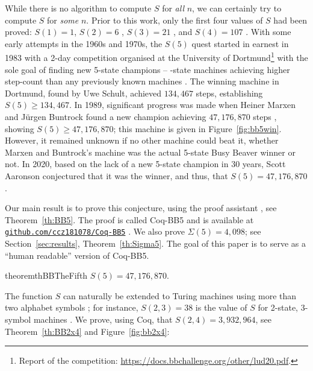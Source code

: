 \documentclass[a4paper,british]{article}
\theoremstyle{definition} %
\numberwithin{equation}{section}
\theoremstyle{definition} %
\newcommand{\BBtheFifth}{47{,}176{,}870}
\newcommand{\SigmaTheFifth}{4{,}098}
\newcommand{\BBTxF}{3{,}932{,}964}
\newcommand{\CoqBB}{Coq-BB5\xspace}
\begin{document}
While there is no algorithm to compute $S$ for \textit{all} $n$, we can certainly try to compute $S$ for \textit{some} $n$. Prior to this work, only the first four values of $S$ had been proved: $S(1)=1$, $S(2)=6$ \cite{Rado_1962}, $S(3) = 21$ \cite{Lin1963}, and $S(4) = 107$ \cite{Brady83}. With some early attempts in the 1960s and 1970s, the $S(5)$ quest started in earnest in 1983 with a 2-day competition organised at the University of Dortmund\footnote{Report of the competition: \url{https://docs.bbchallenge.org/other/lud20.pdf}.} with the sole goal of finding new 5-state champions -- -state machines achieving higher step-count than any previously known machines \cite{PMichel_website,michel2019busy}. The winning machine in Dortmund, found by Uwe Schult, achieved $134{,}467$ steps, establishing $S(5) \geq 134{,}467$. In 1989, significant progress was made when Heiner Marxen and J\"urgen Buntrock found a new champion achieving $\BBtheFifth$ steps \cite{Marxen_1990}, showing $S(5) \geq \BBtheFifth$; this machine is given in Figure~\ref{fig:bb5win}. However, it remained unknown if no other machine could beat it, \ie whether Marxen and Buntrock's machine was the actual 5-state Busy Beaver winner or not. In 2020, based on the lack of a new 5-state champion in 30 years, Scott Aaronson conjectured that it was the winner, and thus, that $S(5) = \BBtheFifth$ \cite{BusyBeaverFrontier}.

Our main result is to prove this conjecture, using the \Coq proof assistant \cite{the_coq_development_team_2024_14542673}, see Theorem~\ref{th:BB5}. The \Coq proof is called \CoqBB and is available at \href{https://github.com/ccz181078/Coq-BB5}{\texttt{github.com/ccz181078/Coq-BB5}} \cite{mxdys_2025_17061968}. We also prove $\Sigma(5) = \SigmaTheFifth$; see Section~\ref{sec:results}, Theorem~\ref{th:Sigma5}. The goal of this paper is to serve as a ``human readable'' version of \CoqBB.

\begin{restatable}[\CoqBB: \texttt{Lemma BB5\_value}]{theorem}{thBBTheFifth}\label{th:BB5}
    $S(5) = \BBtheFifth$.
\end{restatable}

The function $S$ can naturally be extended to Turing machines using more than two alphabet symbols \cite{BradyMeaningOfLife}; for instance, $S(2,3) = 38$ is the value of $S$ for 2-state, 3-symbol machines \cite{BradyMeaningOfLife, MICHEL200445, LafittePapazian2007}. We prove, using Coq, that $S(2,4) = \BBTxF$, see Theorem~\ref{th:BB2x4} and Figure~\ref{fig:bb2x4}:
\end{document}
